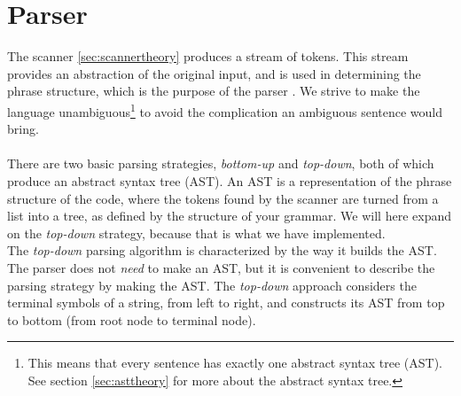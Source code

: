 \section{Parser}
\label{sec:parser}
The scanner \ref{sec:scannertheory} produces a stream of tokens. This stream provides an abstraction of the original input, and is used in determining the phrase structure, which is the purpose of the parser \cite{misc:spo}. We strive to make the language unambiguous\footnote{This means that every sentence has exactly one abstract syntax tree (AST). See section \ref{sec:asttheory} for more about the abstract syntax tree.} to avoid the complication an ambiguous sentence would bring.\\
\\
There are two basic parsing strategies, \textit{bottom-up} and \textit{top-down}, both of which produce an abstract syntax tree (AST). An AST is a representation of the phrase structure of the code, where the tokens found by the scanner are turned from a list into a tree, as defined by the structure of your grammar. \newline
We will here expand on the \textit{top-down} strategy, because that is what we have implemented.\\ \indent
The \textit{top-down} parsing algorithm is characterized by the way it builds the AST. The parser does not \textit{need} to make an AST, but it is convenient to describe the parsing strategy by making the AST. The \textit{top-down} approach considers the terminal symbols of a string, from left to right, and constructs its AST from top to bottom (from root node to terminal node).
